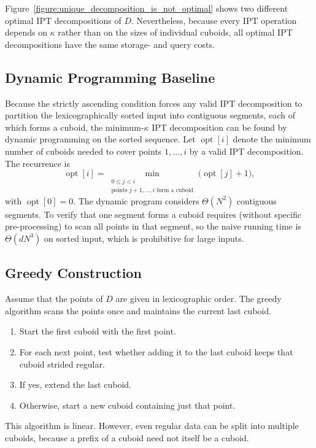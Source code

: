 \documentclass[manuscript,screen,review]{acmart}
\theoremstyle{definition}
\theoremstyle{plain}
\begin{document}
Figure~\ref{figure:unique_decomposition_is_not_optimal} shows two different optimal IPT decompositions of $D$.
Nevertheless, because every IPT operation depends on $\kappa$ rather than on the sizes of individual cuboids, all optimal IPT decompositions have the same storage- and query costs.

\subsection{Dynamic Programming Baseline}

Because the strictly ascending condition forces any valid IPT decomposition to partition the lexicographically sorted input into contiguous segments, each of which forms a cuboid, the minimum-$\kappa$ IPT decomposition can be found by dynamic programming on the sorted sequence. Let $\operatorname{opt}[i]$ denote the minimum number of cuboids needed to cover points $1, \ldots, i$ by a valid IPT decomposition. The recurrence is
\[
  \operatorname{opt}[i] = \min_{\substack{0 \leq j < i \\ \text{points } j{+}1, \ldots, i \text{ form a cuboid}}} \bigl(\operatorname{opt}[j] + 1\bigr),
\]
with $\operatorname{opt}[0] = 0$. The dynamic program considers
$\Theta(N^2)$ contiguous segments. To verify that one segment forms a
cuboid requires (without specific pre-processing) to scan all points
in that segment, so the naive running time is $\Theta(dN^3)$ on sorted
input, which is prohibitive for large
inputs.

\subsection{Greedy Construction}

Assume that the points of $D$ are given in lexicographic order. The
greedy algorithm scans the points once and maintains the current last cuboid.
\begin{enumerate}[leftmargin=*]
  \item Start the first cuboid with the first point.
  \item For each next point, test whether adding it to the last cuboid
    keeps that cuboid strided regular.
  \item If yes, extend the last cuboid.
  \item Otherwise, start a new cuboid containing just that point.
\end{enumerate}

This algorithm is linear. However, even regular data can be split into multiple cuboids, because a prefix of a cuboid need not itself be a cuboid.
\end{document}
